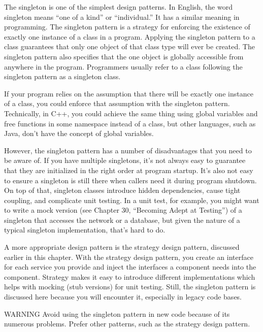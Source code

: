 
The singleton is one of the simplest design patterns. In English, the word singleton means “one of a kind” or “individual.” It has a similar meaning in programming. The singleton pattern is a strategy for enforcing the existence of exactly one instance of a class in a program. Applying the singleton pattern to a class guarantees that only one object of that class type will ever be created. The singleton pattern also specifies that the one object is globally accessible from anywhere in the program. Programmers usually refer to a class following the singleton pattern as a singleton class.

If your program relies on the assumption that there will be exactly one instance of a class, you could enforce that assumption with the singleton pattern. Technically, in C++, you could achieve the same thing using global variables and free functions in some namespace instead of a class, but other languages, such as Java, don’t have the concept of global variables.

However, the singleton pattern has a number of disadvantages that you need to be aware of. If you have multiple singletons, it’s not always easy to guarantee that they are initialized in the right order at program startup. It’s also not easy to ensure a singleton is still there when callers need it during program shutdown. On top of that, singleton classes introduce hidden dependencies, cause tight coupling, and complicate unit testing. In a unit test, for example, you might want to write a mock version (see Chapter 30, “Becoming Adept at Testing”) of a singleton that accesses the network or a database, but given the nature of a typical singleton implementation, that’s hard to do.

A more appropriate design pattern is the strategy design pattern, discussed earlier in this chapter. With the strategy design pattern, you create an interface for each service you provide and inject the interfaces a component needs into the component. Strategy makes it easy to introduce different implementations which helps with mocking (stub versions) for unit testing. Still, the singleton pattern is discussed here because you will encounter it, especially in legacy code bases.

\begin{myWarning}{WARNING}
Avoid using the singleton pattern in new code because of its numerous problems. Prefer other patterns, such as the strategy design pattern.
\end{myWarning}

